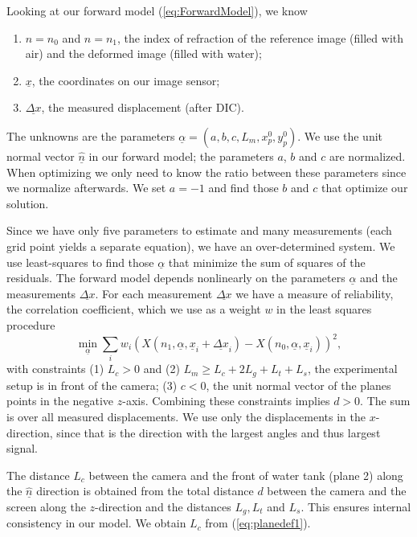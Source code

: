 \documentclass{svjour3}                     %
\begin{document}
\noindent Looking at our forward model (\ref{eq:ForwardModel}), we know
\begin{enumerate}
	\item $n=n_0$ and $n=n_1$, the index of refraction of the reference image (filled with air) and the deformed image (filled with water); 
	\item $\underline{x}$, the coordinates on our image sensor; 
	\item $\underline{\Delta x}$, the measured displacement (after DIC). 
\end{enumerate}
The unknowns are the parameters $\underline{\alpha} = (a, b, c, L_m, x_p^0, y_p^0)$. We use the unit normal vector $\underline{\hat{n}}$ in our forward model; the parameters $a$, $b$ and $c$ are normalized. When optimizing we only need to know the ratio between these parameters since we normalize afterwards. We set $a = - 1$ and find those $b$ and $c$ that optimize our solution. 

Since we have only five parameters to estimate and many measurements (each grid point yields a separate equation), we have an over-determined system. We use least-squares to find those $\underline{\alpha}$ that minimize the sum of squares of the residuals. The forward model depends nonlinearly on the parameters $\underline{\alpha}$ and the measurements $\underline{\Delta x}$. For each measurement $\underline{\Delta x}$ we have a measure of reliability, the correlation coefficient, which we use as a weight $w$ in the least squares procedure
\begin{equation}
\label{eq:calmin} 
	 \min_{\underline{\alpha}} \sum_i w_i \left(X(n_1, \underline{\alpha}, \underline{x}_i+\underline{\Delta x}_i) - X(n_0, \underline{\alpha}, \underline{x}_i)\right)^2, 
\end{equation}
with constraints (1) $L_c > 0$ and (2) $L_m \geq L_c + 2 L_g + L_t + L_s$, the experimental setup is in front of the camera; (3) $c < 0$, the unit normal vector of the planes points in the negative $z$-axis. Combining these constraints implies $d>0$. The sum is over all measured displacements. We use only the displacements in the $x$-direction, since that is the direction with the largest angles and thus largest signal. %

The distance $L_c$ between the camera and the front of water tank (plane 2) along the $\underline{\hat{n}}$ direction is obtained from the total distance $d$ between the camera and the screen along the $z$-direction and the distances $L_g, L_t$ and $L_s$. This ensures internal consistency in our model. We obtain $L_c$ from (\ref{eq:planedef1}).
\end{document}
